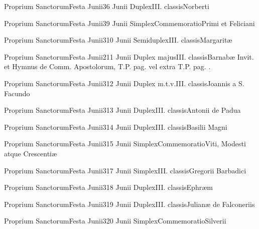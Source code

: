 \documentclass[psalterium-feriale.tex]{subfiles}
\begin{document}
	{Proprium Sanctorum}{Festa Junii}{3}{6 Junii}
	{Duplex}{III. classis}{Norberti}
	{}
	{}
\COPOcdRubric

	{Proprium Sanctorum}{Festa Junii}{3}{9 Junii}
	{Simplex}{Commemoratio}{Primi et Feliciani}
	{}
	{}
\PMEXadRubric

	{Proprium Sanctorum}{Festa Junii}{3}{10 Junii}
	{Semiduplex}{III. classis}{Margaritæ}
	{}
	{}
\MUNNaRubric

	{Proprium Sanctorum}{Festa Junii}{2}{11 Junii}
	{Duplex majus}{III. classis}{Barnabæ}
	{\psalmodiapropria}
	{Invit. et Hymnus de Comm. Apostolorum, T.P. pag. \pageref{M-APTP} vel extra T.P. pag. \pageref{M-APEX}.}

	{Proprium Sanctorum}{Festa Junii}{3}{12 Junii}
	{Duplex m.t.v.}{III. classis}{Joannis a S. Facundo}
	{}
	{}
\COPObRubric

	{Proprium Sanctorum}{Festa Junii}{3}{13 Junii}
	{Duplex}{III. classis}{Antonii de Padua}
	{}
	{}
\COPObRubric

	{Proprium Sanctorum}{Festa Junii}{3}{14 Junii}
	{Duplex}{III. classis}{Basilii Magni}
	{}
	{}
\COPOcRubric

	{Proprium Sanctorum}{Festa Junii}{3}{15 Junii}
	{Simplex}{Commemoratio}{Viti, Modesti atque Crescentiæ\linebreak\null}
	{}
	{}
\PMEXaRubric

	{Proprium Sanctorum}{Festa Junii}{3}{17 Junii}
	{Simplex}{III. classis}{Gregorii Barbadici}
	{}
	{}
\COPOaRubric

	{Proprium Sanctorum}{Festa Junii}{3}{18 Junii}
	{Duplex}{III. classis}{Ephræm}
	{}
	{}
\COPOcRubric

	{Proprium Sanctorum}{Festa Junii}{3}{19 Junii}
	{Duplex}{III. classis}{Julianæ de Falconeriis}
	{}
	{}

	{Proprium Sanctorum}{Festa Junii}{3}{20 Junii}
	{Simplex}{Commemoratio}{Silverii}
	{}
	{}
\UMEXaRubric
\end{document}
